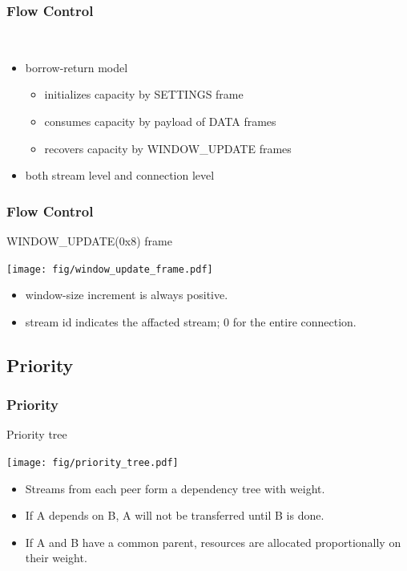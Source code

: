 \documentclass[lualatex]{beamer}
\begin{document}
\begin{frame}
  \frametitle{Flow Control}
  \begin{block}{~}
    \begin{itemize}
    \item borrow-return model
      \begin{itemize}
      \item initializes capacity by SETTINGS frame
      \item consumes capacity by payload of DATA frames
      \item recovers capacity by WINDOW\_UPDATE frames
      \end{itemize}
    \item both stream level and connection level
    \end{itemize}
  \end{block}
\end{frame}

\begin{frame}
  \frametitle{Flow Control}
  \begin{block}{WINDOW\_UPDATE(0x8) frame}
    \begin{center}
      \texttt{[image: fig/window\_update\_frame.pdf]}
    \end{center}
    \begin{itemize}
    \item window-size increment is always positive.
    \item stream id indicates the affacted stream; 0 for the entire connection.
    \end{itemize}
  \end{block}
\end{frame}

\subsection{Priority}

\begin{frame}
  \frametitle{Priority}
  \begin{block}{Priority tree}
    \begin{center}
      \texttt{[image: fig/priority\_tree.pdf]}
    \end{center}
    \begin{itemize}
    \item Streams from each peer form a dependency tree with weight.
    \item If A depends on B, A will not be transferred until B is done.
    \item If A and B have a common parent, resources are allocated proportionally on their weight.
    \end{itemize}
  \end{block}
\end{frame}
\end{document}
